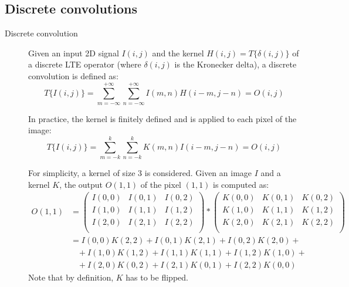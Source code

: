 \subsection{Discrete convolutions}

\begin{description}
    \item[Discrete convolution] 
        Given an input 2D signal $I(i, j)$ and the kernel $H(i, j) = T\{ \delta(i, j) \}$ of a discrete LTE operator (where $\delta(i, j)$ is the Kronecker delta),
        a discrete convolution is defined as:
        \[ T\{ I(i, j) \} = \sum_{m=-\infty}^{+\infty} \sum_{n=-\infty}^{+\infty} I(m, n)H(i-m, j-n) = O(i, j) \]

        In practice, the kernel is finitely defined and is applied to each pixel of the image:
        \[ T\{ I(i, j) \} = \sum_{m=-k}^{k} \sum_{n=-k}^{k} K(m, n)I(i-m, j-n) = O(i, j) \]

        \begin{example}
            For simplicity, a kernel of size 3 is considered.
            Given an image $I$ and a kernel $K$, the output $O(1, 1)$ of the pixel $(1, 1)$ is computed as:
            \[
                \begin{split}
                    O(1, 1) &= \begin{pmatrix}
                        I(0, 0) & I(0, 1) & I(0, 2) \\
                        I(1, 0) & I(1, 1) & I(1, 2) \\
                        I(2, 0) & I(2, 1) & I(2, 2) \\
                    \end{pmatrix}
                    *
                    \begin{pmatrix}
                        K(0, 0) & K(0, 1) & K(0, 2) \\
                        K(1, 0) & K(1, 1) & K(1, 2) \\
                        K(2, 0) & K(2, 1) & K(2, 2) \\
                    \end{pmatrix} \\
                    &= I(0, 0)K(2, 2) + I(0, 1)K(2, 1) + I(0, 2)K(2, 0) + \\
                        &\,\,\,\,\,+ I(1, 0)K(1, 2) + I(1, 1)K(1, 1) + I(1, 2)K(1, 0) + \\
                        &\,\,\,\,\,+ I(2, 0)K(0, 2) + I(2, 1)K(0, 1) + I(2, 2)K(0, 0)
                \end{split}
            \] 
            Note that by definition, $K$ has to be flipped.
        \end{example}


\end{description}

